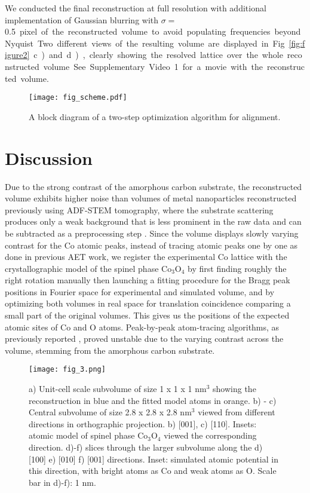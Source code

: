 \documentclass[12pt]{iopart}
\begin{document}
We conducted the final reconstruction at full resolution with additional implementation of Gaussian blurring with $\sigma=$\SI{0.5} pixel of the reconstructed volume to avoid populating frequencies beyond Nyquist. Two different views of the resulting volume are displayed in Fig. \ref{fig:figure2} c) and d), clearly showing the resolved lattice over the whole reconstructed volume. See Supplementary Video 1 for a movie with the reconstructed volume.
\begin{figure*}[ht!]
\centering
\texttt{[image: fig\_scheme.pdf]}
\caption{\label{fig:figure3} A block diagram of a two-step optimization algorithm for alignment.}
\end{figure*}
\section{Discussion}
Due to the strong contrast of the amorphous carbon substrate, the reconstructed volume exhibits higher noise than volumes of metal nanoparticles reconstructed previously using ADF-STEM tomography, where the substrate scattering produces only a weak background that is less prominent in the raw data and can be subtracted as a preprocessing step \cite{yang2017deciphering}. Since the volume displays slowly varying contrast for the Co atomic peaks, instead of tracing atomic peaks one by one as done in previous AET work, we register the experimental Co lattice with the crystallographic model of the spinel phase $\mathrm{Co_{3}O_{4}}$ by first finding roughly the right rotation manually then launching a fitting procedure for the Bragg peak positions in Fourier space for experimental and simulated volume, and by optimizing both volumes in real space for translation coincidence comparing a small part of the original volumes. This gives us the positions of the expected atomic sites of Co and O atoms. Peak-by-peak atom-tracing algorithms, as previously reported \cite{AET_miao2016atomic}, proved unstable due to the varying contrast across the volume, stemming from the amorphous carbon substrate.
\begin{figure*}[ht!]
\label{fig:figure4}
\texttt{[image: fig\_3.png]}
\caption{a) Unit-cell scale subvolume of size \num{1} x \num{1} x \num{1} $\mathrm{nm}^3$ showing the reconstruction in blue and the fitted model atoms in orange. b) - c) Central subvolume of size \num{2.8} x \num{2.8} x \num{2.8} $\mathrm{nm}^3$ viewed from different directions in orthographic projection. b) [001], c) [110]. Insets: atomic model of spinel phase $\mathrm{Co_{3}O_{4}}$ viewed the corresponding direction. d)-f) slices through the larger subvolume along the d) [100] e) [010] f) [001] directions. Inset: simulated atomic potential in this direction, with bright atoms as Co and weak atoms as O. Scale bar in d)-f): 1 nm.}
\end{figure*}
\end{document}
